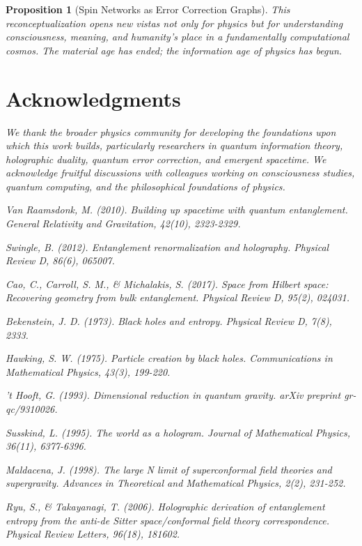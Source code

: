 \documentclass[12pt,a4paper]{article}
\newtheorem{proposition}[theorem]{Proposition}
\theoremstyle{remark}
\begin{document}
\begin{proposition}[Spin Networks as Error Correction Graphs]
This reconceptualization opens new vistas not only for physics but for understanding consciousness, meaning, and humanity's place in a fundamentally computational cosmos. The material age has ended; the information age of physics has begun.

\section*{Acknowledgments}

We thank the broader physics community for developing the foundations upon which this work builds, particularly researchers in quantum information theory, holographic duality, quantum error correction, and emergent spacetime. We acknowledge fruitful discussions with colleagues working on consciousness studies, quantum computing, and the philosophical foundations of physics.

\begin{thebibliography}{99}

Van Raamsdonk, M. (2010). Building up spacetime with quantum entanglement. \textit{General Relativity and Gravitation}, 42(10), 2323-2329.

Swingle, B. (2012). Entanglement renormalization and holography. \textit{Physical Review D}, 86(6), 065007.

Cao, C., Carroll, S. M., \& Michalakis, S. (2017). Space from Hilbert space: Recovering geometry from bulk entanglement. \textit{Physical Review D}, 95(2), 024031.

Bekenstein, J. D. (1973). Black holes and entropy. \textit{Physical Review D}, 7(8), 2333.

Hawking, S. W. (1975). Particle creation by black holes. \textit{Communications in Mathematical Physics}, 43(3), 199-220.

't Hooft, G. (1993). Dimensional reduction in quantum gravity. \textit{arXiv preprint gr-qc/9310026}.

Susskind, L. (1995). The world as a hologram. \textit{Journal of Mathematical Physics}, 36(11), 6377-6396.

Maldacena, J. (1998). The large N limit of superconformal field theories and supergravity. \textit{Advances in Theoretical and Mathematical Physics}, 2(2), 231-252.

Ryu, S., \& Takayanagi, T. (2006). Holographic derivation of entanglement entropy from the anti-de Sitter space/conformal field theory correspondence. \textit{Physical Review Letters}, 96(18), 181602.


\end{thebibliography}
\end{proposition}
\end{document}
